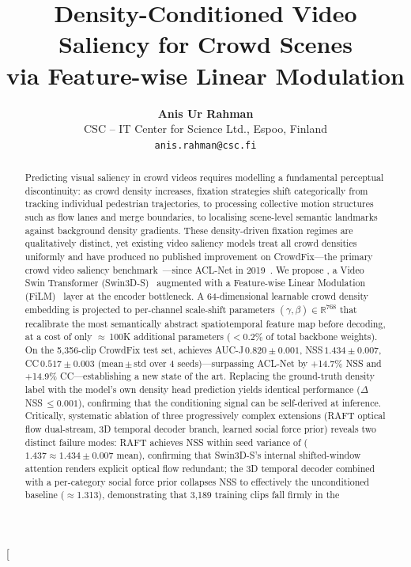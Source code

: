 \documentclass[twocolumn]{article}
\title{\textbf{Density-Conditioned Video Saliency for Crowd Scenes\\
via Feature-wise Linear Modulation}}
\author{%
  \textbf{Anis Ur Rahman}\\
  CSC -- IT Center for Science Ltd., Espoo, Finland\\
  \texttt{anis.rahman@csc.fi}
}
\date{}
\begin{document}
\twocolumn[
  \begin{center}
    \maketitle
    \thispagestyle{empty}
    \begin{minipage}{0.92\linewidth}
      \begin{abstract}
Predicting visual saliency in crowd videos requires modelling a fundamental
perceptual discontinuity: as crowd density increases, fixation strategies
shift categorically from tracking individual pedestrian trajectories, to
processing collective motion structures such as flow lanes and merge
boundaries, to localising scene-level semantic landmarks against background
density gradients. These density-driven fixation regimes are qualitatively
distinct, yet existing video saliency models treat all crowd densities
uniformly and have produced no published improvement on CrowdFix---the
primary crowd video saliency benchmark~\citep{crowdfix}---since
ACL-Net in 2019~\citep{aclnet}.
We propose \ourmodel, a Video Swin Transformer (Swin3D-S)~\citep{video_swin}
augmented with a Feature-wise Linear Modulation (FiLM)~\citep{film}
layer at the encoder bottleneck.
A 64-dimensional learnable crowd density embedding is projected to per-channel
scale-shift parameters $(\gamma,\beta)\in\mathbb{R}^{768}$ that recalibrate
the most semantically abstract spatiotemporal feature map before decoding,
at a cost of only $\approx$\,100K additional parameters
($<\!0.2\%$ of total backbone weights).
On the 5,356-clip CrowdFix test set, \ourmodel{} achieves
AUC-J\,$0.820\pm0.001$, NSS\,$1.434\pm0.007$, CC\,$0.517\pm0.003$
(mean\,$\pm$\,std over 4 seeds)---surpassing ACL-Net by
+14.7\% NSS and +14.9\% CC---establishing a new state of the art.
Replacing the ground-truth density label with the model's own density
head prediction yields identical performance ($\Delta$NSS\,$\leq\!0.001$),
confirming that the conditioning signal can be self-derived at inference.
Critically, systematic ablation of three progressively complex extensions
(RAFT optical flow dual-stream, 3D temporal decoder branch, learned
social force prior) reveals two distinct failure modes: RAFT achieves
NSS within seed variance of \ourmodel{} ($1.437\approx1.434\pm0.007$ mean), confirming that Swin3D-S's internal
shifted-window attention renders explicit optical flow redundant; the
3D temporal decoder combined with a per-category social force prior
collapses NSS to effectively the unconditioned baseline ($\approx$1.313),
demonstrating that 3,189 training clips fall firmly in the

\end{abstract}
\end{minipage}
\end{center}
\end{document}
